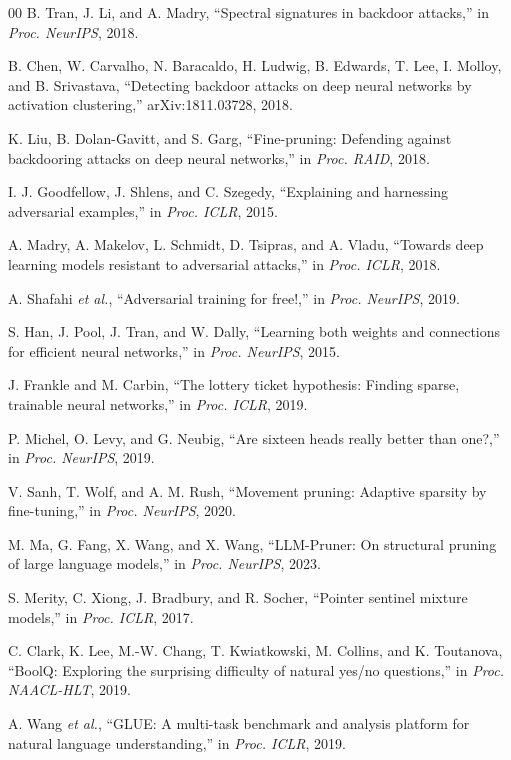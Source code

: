 \documentclass[lettersize,journal]{IEEEtran}
\begin{document}
\begin{thebibliography}{00}
B. Tran, J. Li, and A. Madry, ``Spectral signatures in backdoor attacks,'' in \emph{Proc. NeurIPS}, 2018.

B. Chen, W. Carvalho, N. Baracaldo, H. Ludwig, B. Edwards, T. Lee, I. Molloy, and B. Srivastava, ``Detecting backdoor attacks on deep neural networks by activation clustering,'' arXiv:1811.03728, 2018.

K. Liu, B. Dolan-Gavitt, and S. Garg, ``Fine-pruning: Defending against backdooring attacks on deep neural networks,'' in \emph{Proc. RAID}, 2018.

I. J. Goodfellow, J. Shlens, and C. Szegedy, ``Explaining and harnessing adversarial examples,'' in \emph{Proc. ICLR}, 2015.

A. Madry, A. Makelov, L. Schmidt, D. Tsipras, and A. Vladu, ``Towards deep learning models resistant to adversarial attacks,'' in \emph{Proc. ICLR}, 2018.

A. Shafahi \emph{et al.}, ``Adversarial training for free!,'' in \emph{Proc. NeurIPS}, 2019.

S. Han, J. Pool, J. Tran, and W. Dally, ``Learning both weights and connections for efficient neural networks,'' in \emph{Proc. NeurIPS}, 2015.

J. Frankle and M. Carbin, ``The lottery ticket hypothesis: Finding sparse, trainable neural networks,'' in \emph{Proc. ICLR}, 2019.

P. Michel, O. Levy, and G. Neubig, ``Are sixteen heads really better than one?,'' in \emph{Proc. NeurIPS}, 2019.

V. Sanh, T. Wolf, and A. M. Rush, ``Movement pruning: Adaptive sparsity by fine-tuning,'' in \emph{Proc. NeurIPS}, 2020.

M. Ma, G. Fang, X. Wang, and X. Wang, ``LLM-Pruner: On structural pruning of large language models,'' in \emph{Proc. NeurIPS}, 2023.

S. Merity, C. Xiong, J. Bradbury, and R. Socher, ``Pointer sentinel mixture models,'' in \emph{Proc. ICLR}, 2017.

C. Clark, K. Lee, M.-W. Chang, T. Kwiatkowski, M. Collins, and K. Toutanova, ``BoolQ: Exploring the surprising difficulty of natural yes/no questions,'' in \emph{Proc. NAACL-HLT}, 2019.

A. Wang \emph{et al.}, ``GLUE: A multi-task benchmark and analysis platform for natural language understanding,'' in \emph{Proc. ICLR}, 2019.


\end{thebibliography}
\end{document}

